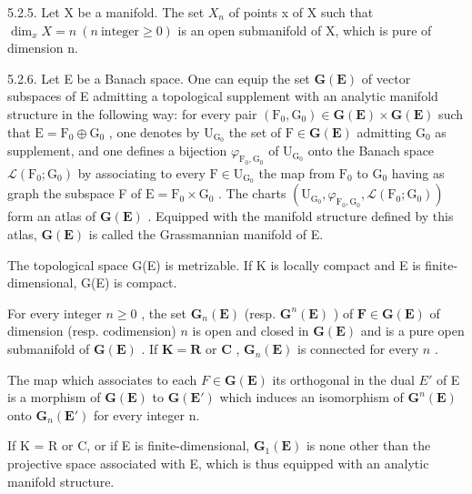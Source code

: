 5.2.5. Let X be a manifold. The set \(X_{n}\) of points x of X such that \(\dim_{x}X=n\ (n\ \text{integer}\geqslant0)\) is an open submanifold of X, which is pure of dimension n.

5.2.6. Let E be a Banach space. One can equip the set \(\mathbf{G}(\mathbf{E})\) of vector subspaces of E admitting a topological supplement with an analytic manifold structure in the following way: for every pair \((\mathrm{F}_0, \mathrm{G}_0) \in \mathbf{G}(\mathbf{E}) \times \mathbf{G}(\mathbf{E})\) such that \(\mathrm{E} = \mathrm{F}_0 \oplus \mathrm{G}_0\) , one denotes by \(\mathrm{U}_{\mathrm{G}_0}\) the set of \(\mathrm{F} \in \mathbf{G}(\mathbf{E})\) admitting \(\mathrm{G}_0\) as supplement, and one defines a bijection \(\varphi_{\mathrm{F}_0, \mathrm{G}_0}\) of \(\mathrm{U}_{\mathrm{G}_0}\) onto the Banach space \(\mathcal{L}(\mathrm{F}_0; \mathrm{G}_0)\) by associating to every \(\mathrm{F} \in \mathrm{U}_{\mathrm{G}_0}\) the map from \(\mathrm{F}_0\) to \(\mathrm{G}_0\) having as graph the subspace F of \(\mathrm{E} = \mathrm{F}_0 \times \mathrm{G}_0\) . The charts \((\mathrm{U}_{\mathrm{G}_0}, \varphi_{\mathrm{F}_0, \mathrm{G}_0}, \mathcal{L}(\mathrm{F}_0; \mathrm{G}_0))\) form an atlas of \(\mathbf{G}(\mathbf{E})\) . Equipped with the manifold structure defined by this atlas, \(\mathbf{G}(\mathbf{E})\) is called the Grassmannian manifold of E.

The topological space G(E) is metrizable. If K is locally compact and E is finite-dimensional, G(E) is compact.

For every integer \(n \geqslant 0\) , the set \(\mathbf{G}_{n}(\mathbf{E})\) (resp. \(\mathbf{G}^{n}(\mathbf{E})\) ) of \(\mathbf{F} \in \mathbf{G}(\mathbf{E})\) of dimension (resp. codimension) \(n\) is open and closed in \(\mathbf{G}(\mathbf{E})\) and is a pure open submanifold of \(\mathbf{G}(\mathbf{E})\) . If \(\mathbf{K} = \mathbf{R}\) or \(\mathbf{C}\) , \(\mathbf{G}_{n}(\mathbf{E})\) is connected for every \(n\) .

The map which associates to each \(F \in \mathbf{G}(\mathbf{E})\) its orthogonal in the dual \(E'\) of E is a morphism of \(\mathbf{G}(\mathbf{E})\) to \(\mathbf{G}(\mathbf{E}')\) which induces an isomorphism of \(\mathbf{G}^{n}(\mathbf{E})\) onto \(\mathbf{G}_{n}(\mathbf{E}')\) for every integer n.

If K = R or C, or if E is finite-dimensional, \(\mathbf{G}_{1}(\mathbf{E})\) is none other than the projective space associated with E, which is thus equipped with an analytic manifold structure.

